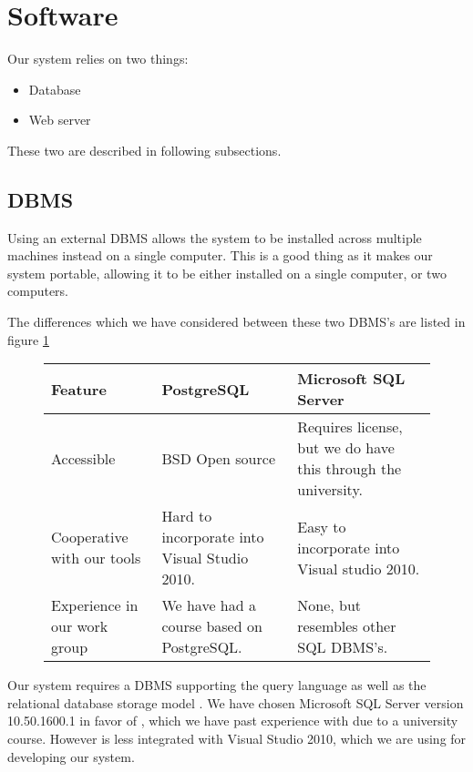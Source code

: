 \section{Software}
\label{sec:software}

Our system relies on two things:

\begin{itemize}
	\item Database
	\item Web server
\end{itemize}

These two are described in following subsections.

\subsection{DBMS}
\label{subsec:dbms}

Using an external DBMS allows the system to be installed across multiple machines instead on a single computer. This is a good thing as it makes our system portable, allowing it to be either installed on a single computer, or two computers.

The differences which we have considered between these two DBMS's are listed in figure \ref{fig:DBMS}\cite{postgres08}

\begin{figure}[htb]
	\centering
		\begin{tabularx}{\textwidth}{L|L|L}
			\textbf{Feature}&\textbf{PostgreSQL}&\textbf{Microsoft SQL Server} \\
			\hline
			Accessible&BSD Open source&Requires license, but we do have this through the university. \\ 
			Cooperative with our tools&Hard to incorporate into Visual Studio 2010. & Easy to incorporate into Visual studio 2010. \\ 
			Experience in our work group&We have had a course based on PostgreSQL. & None, but resembles other SQL DBMS's. \\ 
		\end{tabularx}
	\label{fig:DBMS}
\end{figure}

Our system requires a DBMS supporting the query language \sql[] as well as the relational database storage model .
We have chosen Microsoft SQL Server version 10.50.1600.1 in favor of \posgresql[], which we have past experience with due to a university course.
However \posgresql[] is less integrated with Visual Studio 2010, which we are using for developing our system.

